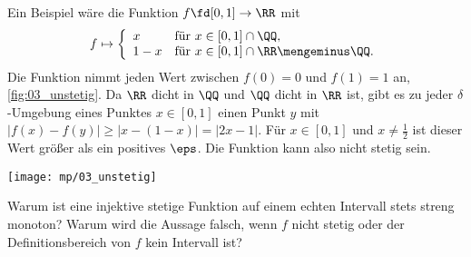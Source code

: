 \begin{antwort}
  Ein Beispiel wäre die Funktion $f\fd [0,1] \to \RR$ mit
  \[
  f \mapsto \left\{ 
    \begin{array}{ll}
      x   & \text{für $x\in [0,1] \cap \QQ$},\\
      1-x & \text{für $x\in [0,1] \cap\RR \mengeminus \QQ$.}
    \end{array}
  \right.
  \]
  Die Funktion nimmt jeden Wert zwischen $f(0)=0$ und $f(1)=1$ an, 
  \sieheAbbildung\ref{fig:03_unstetig}. 
  Da $\RR$ dicht in $\QQ$ und $\QQ$ dicht in $\RR$ ist, 
  gibt es zu jeder $\delta$-Umgebung eines Punktes $x\in [0,1]$ 
  einen Punkt $y$ mit $|f(x)-f(y)| \ge | x-(1-x) | = |2x-1|$. 
  Für $x\in [0,1]$ und $x\not=\frac{1}{2}$ ist dieser Wert größer 
  als ein positives $\eps$. Die Funktion kann also nicht stetig sein.
  \AntEnd

  \begin{center}
    \texttt{[image: mp/03\_unstetig]}
    \label{fig:03_unstetig}
  \end{center}

\end{antwort}

\begin{frage}\label{03_injm}
  Warum ist eine injektive stetige Funktion auf einem echten Intervall 
  stets streng monoton? 
  Warum wird die Aussage falsch, wenn $f$ nicht stetig oder der 
  Definitionsbereich von $f$ kein Intervall ist?
\end{frage}

